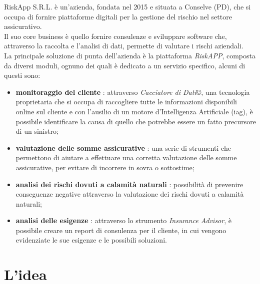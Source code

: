 RiskApp S.R.L. è un'azienda, fondata nel 2015 e situata a Conselve (PD), che si occupa di fornire piattaforme digitali per la gestione del rischio nel settore assicurativo.\\
Il suo core business è quello fornire consulenze e sviluppare software che, attraverso la raccolta e l'analisi di dati, permette di valutare i rischi aziendali. \\
La principale soluzione di punta dell'azienda è la piattaforma \emph{RiskAPP}, composta da diversi moduli, ognuno dei quali è dedicato a un servizio specifico, alcuni di questi sono:
\begin{itemize}
    \item \textbf{monitoraggio del cliente} \cite{site:riskapp}: attraverso \emph{Cacciatore di Dati}\copyright, una tecnologia proprietaria che si occupa di raccogliere tutte le informazioni disponibili online sul cliente e con l'ausilio di un motore d'Intelligenza Artificiale (\gls{iag}\glsoccur), è possibile identificare la causa di quello che potrebbe essere un fatto precursore di un sinistro;
    \item \textbf{valutazione delle somme assicurative} \cite{site:riskapp}: una serie di strumenti che permettono di aiutare a effettuare una corretta valutazione delle somme assicurative, per evitare di incorrere in sovra o sottostime;
    \item \textbf{analisi dei rischi dovuti a calamità naturali} \cite{site:riskapp}: possibilità di prevenire conseguenze negative attraverso la valutazione dei rischi dovuti a calamità naturali;
    \item \textbf{analisi delle esigenze} \cite{site:riskapp}: attraverso lo strumento \emph{Insurance Advisor}, è possibile creare un report di consulenza per il cliente, in cui vengono evidenziate le sue esigenze e le possibili soluzioni.
\end{itemize}

\section{L'idea}
\label{sec:idea}

